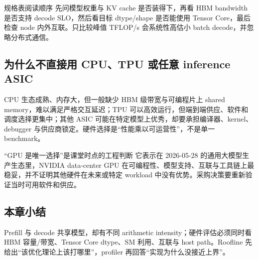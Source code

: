 
\begin{importantbox}{规格表阅读顺序}
先问模型权重与 KV cache 是否装得下，再看 HBM bandwidth 是否支持 decode SLO，然后看目标 dtype/shape 是否能使用 Tensor Core，最后检查 node 内外互联。只比较峰值 TFLOP/s 会系统性高估小 batch decode，并忽略分布式通信。
\end{importantbox}

\subsection{为什么不直接用 CPU、TPU 或任意 inference ASIC}

CPU 生态成熟、内存大，但一般缺少 HBM 级带宽与可编程片上 shared memory，难以满足严格交互延迟；TPU 可以高效运行，但端到端供应、软件和调度选择更集中；其他 ASIC 可能在特定模型上优秀，却要承担编译器、kernel、debugger 与供应商锁定。硬件选择是“性能乘以可运营性”，不是单一 benchmark。


\begin{warningbox}{“GPU 是唯一选择”是课堂时点的工程判断}
它表示在 2026-05-28 的通用大模型生产生态里，NVIDIA data-center GPU 在可编程性、模型支持、互联与工具链上最稳妥，并不证明其他硬件在未来或特定 workload 中没有优势。采购决策要重新验证当时可用软件和供应。
\end{warningbox}

\subsection{本章小结}

Prefill 与 decode 共享模型，却有不同 arithmetic intensity；硬件评估必须同时看 HBM 容量/带宽、Tensor Core dtype、SM 利用、互联与 host path。Roofline 先给出“该优化理论上该打哪里”，profiler 再回答“实现为什么没接近上界”。


